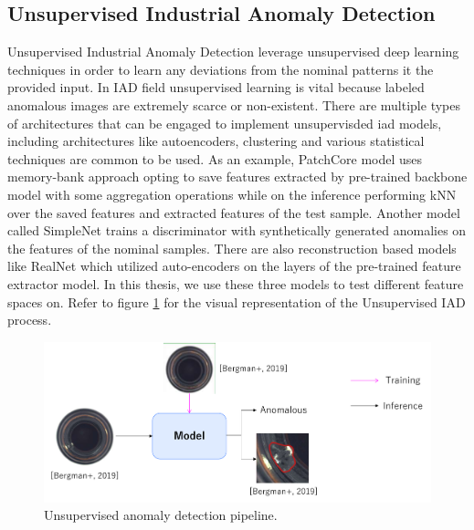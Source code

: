 \clearpage
\subsection{Unsupervised Industrial Anomaly Detection}
\label{unsupervised iad}
Unsupervised Industrial Anomaly Detection leverage unsupervised deep learning techniques in order to learn any deviations from the nominal patterns it the provided input. In IAD field unsupervised learning is vital because labeled anomalous images are extremely scarce or non-existent. There are multiple types of architectures that can be engaged to implement unsupervisded iad models, including architectures like autoencoders, clustering and various statistical techniques are common to be used. As an example, PatchCore model uses memory-bank approach opting to save features extracted by pre-trained backbone model with some aggregation operations while on the inference performing kNN over the saved features and extracted features of the test sample. Another model called SimpleNet trains a discriminator with synthetically generated anomalies on the features of the nominal samples. There are also reconstruction based models like RealNet which utilized auto-encoders on the layers of the pre-trained feature extractor model. In this thesis, we use these three models to test different feature spaces on. Refer to figure \ref{fig:uiad} for the visual representation of the Unsupervised IAD process.

\begin{figure}[h]
	\begin{center}
		\includegraphics[width=0.8\linewidth]{Chapter_2/uiad.png}
	\end{center}
	\caption{Unsupervised anomaly detection pipeline.}
	\label{fig:uiad}
\end{figure}

\clearpage
